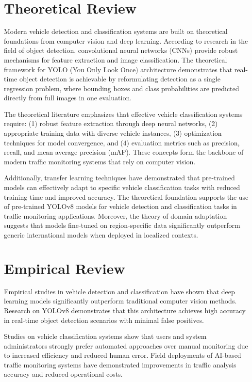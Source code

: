 \documentclass[12pt,a4paper]{report}
\begin{document}
\section{Theoretical Review}

Modern vehicle detection and classification systems are built on theoretical foundations from computer vision and deep learning. According to research in the field of object detection, convolutional neural networks (CNNs) provide robust mechanisms for feature extraction and image classification. The theoretical framework for YOLO (You Only Look Once) architecture demonstrates that real-time object detection is achievable by reformulating detection as a single regression problem, where bounding boxes and class probabilities are predicted directly from full images in one evaluation.

The theoretical literature emphasizes that effective vehicle classification systems require: (1) robust feature extraction through deep neural networks, (2) appropriate training data with diverse vehicle instances, (3) optimization techniques for model convergence, and (4) evaluation metrics such as precision, recall, and mean average precision (mAP). These concepts form the backbone of modern traffic monitoring systems that rely on computer vision.

Additionally, transfer learning techniques have demonstrated that pre-trained models can effectively adapt to specific vehicle classification tasks with reduced training time and improved accuracy. The theoretical foundation supports the use of pre-trained YOLOv8 models for vehicle detection and classification tasks in traffic monitoring applications. Moreover, the theory of domain adaptation suggests that models fine-tuned on region-specific data significantly outperform generic international models when deployed in localized contexts.


\section{Empirical Review}

Empirical studies in vehicle detection and classification have shown that deep learning models significantly outperform traditional computer vision methods. Research on YOLOv8 demonstrates that this architecture achieves high accuracy in real-time object detection scenarios with minimal false positives.

Studies on vehicle classification systems show that users and system administrators strongly prefer automated approaches over manual monitoring due to increased efficiency and reduced human error. Field deployments of AI-based traffic monitoring systems have demonstrated improvements in traffic analysis accuracy and reduced operational costs.
\end{document}

